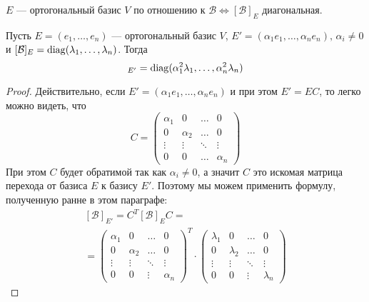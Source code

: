 \documentclass[../main.tex]{subfiles}
\begin{document}
\begin{remark}
  $E$ --- ортогональный базис $V$ по отношению к $\mathcal{B} \iff [\mathcal{B}]_E$ диагональная.
\end{remark}

\begin{remark}
  Пусть $E = (e_1, \dotsc, e_n)$ --- ортогональный базис $V$,\; $E' = (\alpha_1 e_1, \dotsc, \alpha_n e_n),\, \alpha_i \neq 0$ и $[\mathcal{B}]_E = \operatorname{diag}(\lambda_1, \dotsc, \lambda_n)$. Тогда
  \begin{equation*}
    [\mathcal{B}]_{E'} = \diag(\alpha_1^2 \lambda_1, \dotsc, \alpha_n^2 \lambda_n)
  \end{equation*}
\end{remark}
\begin{proof}
  Действительно, если $E' = (\alpha_1 e_1, \dotsc, \alpha_n e_n)$ и при этом $E' = EC$, то легко можно видеть, что
  \begin{equation*}
    C = \begin{pmatrix}
      \alpha_1 & 0 & \hdots & 0 \\
      0 & \alpha_2 & \hdots & 0 \\
      \vdots & \vdots & \ddots & \vdots \\
      0 & 0 & \hdots & \alpha_n
    \end{pmatrix}
  \end{equation*}
  При этом $C$ будет обратимой так как $\alpha_i \neq 0$, а значит $C$ это искомая матрица перехода от базиса $E$ к базису $E'$. Поэтому мы можем применить формулу, полученную ранне в этом параграфе:
  \begin{equation*}
    \begin{gathered}
      [\mathcal{B}]_{E'} = C^T [\mathcal{B}]_E C
      = \\ =
      \begin{pmatrix}
        \alpha_1 & 0 & \hdots & 0 \\
        0 & \alpha_2 & \hdots & 0 \\
        \vdots & \vdots & \ddots & \vdots \\
        0 & 0 & \vdots & \alpha_n
      \end{pmatrix}^T
      \cdot
      \begin{pmatrix}
        \lambda_1 & 0 & \hdots & 0 \\
        0 & \lambda_2 & \hdots & 0 \\
        \vdots & \vdots & \ddots & \vdots \\
        0 & 0 & \vdots & \lambda_n
      \end{pmatrix}

\end{gathered}
\end{equation*}
\end{proof}
\end{document}
